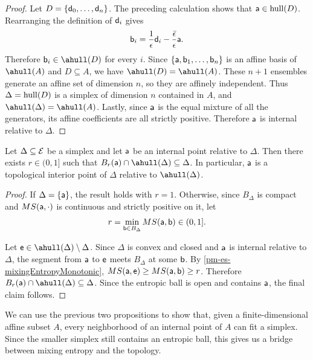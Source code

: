 \begin{mathSection}
\begin{proof}
		Let $D = \{\ens[d]_0, \dots, \ens[d]_n\}$. The preceding calculation shows that $\ens[a] \in \hull(D)$. Rearranging the definition of $\ens[d]_i$ gives
		\begin{equation}
			\ens[b]_i = \frac{1}{\epsilon}\ens[d]_i
			- \frac{\bar{\epsilon}}{\epsilon}\ens[a].
		\end{equation}
		Therefore $\ens[b]_i \in \ahull(D)$ for every $i$. Since $\{\ens[a], \ens[b]_1, \dots, \ens[b]_n\}$ is an affine basis of $\ahull(A)$ and $D \subseteq A$, we have $\ahull(D) = \ahull(A)$. These $n+1$ ensembles generate an affine set of dimension $n$, so they are affinely independent. Thus $\Delta = \hull(D)$ is a simplex of dimension $n$ contained in $A$, and $\ahull(\Delta) = \ahull(A)$. Lastly, since $\ens[a]$ is the equal mixture of all the generators, its affine coefficients are all strictly positive. Therefore $\ens[a]$ is internal relative to $\Delta$.
	\end{proof}
	
	\begin{prop}\label{pm-es-simplexEntropicNeighborhood}
		Let $\Delta \subseteq \Ens$ be a simplex and let $\ens[a]$ be an internal point relative to $\Delta$. Then there exists $r \in (0,1]$ such that $B_r(\ens[a])\cap\ahull(\Delta) \subseteq \Delta$. In particular, $\ens[a]$ is a topological interior point of $\Delta$ relative to $\ahull(\Delta)$.
	\end{prop}
	
	\begin{proof}
		If $\Delta = \{\ens[a]\}$, the result holds with $r=1$. Otherwise, since $B_\Delta$ is compact and $MS(\ens[a],\cdot)$ is continuous and strictly positive on it, let
		\begin{equation}
			r = \min_{\ens[b] \in B_\Delta} MS(\ens[a],\ens[b]) \in (0,1].
		\end{equation}
		
		Let $\ens[e] \in \ahull(\Delta)\setminus\Delta$. Since $\Delta$ is convex and closed and $\ens[a]$ is internal relative to $\Delta$, the segment from $\ens[a]$ to $\ens[e]$ meets $B_\Delta$ at some $\ens[b]$. By \ref{pm-es-mixingEntropyMonotonic}, $MS(\ens[a],\ens[e]) \geq MS(\ens[a],\ens[b]) \geq r$.	Therefore $B_r(\ens[a])\cap\ahull(\Delta) \subseteq \Delta$. Since the entropic ball is open and contains $\ens[a]$, the final claim follows.
	\end{proof}
\end{mathSection}

We can use the previous two propositions to show that, given a finite-dimensional affine subset $A$, every neighborhood of an internal point of $A$ can fit a simplex. Since the smaller simplex still contains an entropic ball, this gives us a bridge between mixing entropy and the topology.

